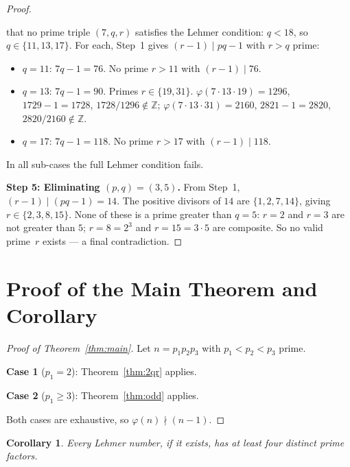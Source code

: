 \documentclass[12pt,a4paper]{amsart}
\newtheorem{corollary}[theorem]{Corollary}
\theoremstyle{definition}
\newcommand{\euler}{\varphi}
\begin{document}
\begin{proof}
\begin{itemize}
        that no prime triple $(7, q, r)$ satisfies the Lehmer condition:
        $q < 18$, so $q \in \{11, 13, 17\}$.  For each, Step~1
        gives $(r-1) \mid pq-1$ with $r > q$ prime:
        \begin{itemize}
          \item $q = 11$: $7q-1 = 76$.  No prime $r > 11$ with $(r-1) \mid 76$.
          \item $q = 13$: $7q-1 = 90$.  Primes $r \in \{19, 31\}$.
                $\varphi(7 \cdot 13 \cdot 19) = 1296$, $1729-1 = 1728$,
                $1728/1296 \notin \mathbb{Z}$;
                $\varphi(7 \cdot 13 \cdot 31) = 2160$, $2821-1 = 2820$,
                $2820/2160 \notin \mathbb{Z}$.
          \item $q = 17$: $7q-1 = 118$.  No prime $r > 17$ with $(r-1) \mid 118$.
        \end{itemize}
        In all sub-cases the full Lehmer condition fails.
\end{itemize}

\medskip
\noindent\textbf{Step 5: Eliminating $(p, q) = (3, 5)$.}
From Step~1, $(r-1) \mid (pq - 1) = 14$.  The positive divisors of $14$ are
$\{1, 2, 7, 14\}$, giving $r \in \{2, 3, 8, 15\}$.
None of these is a prime greater than $q = 5$:
$r = 2$ and $r = 3$ are not greater than $5$;
$r = 8 = 2^3$ and $r = 15 = 3 \cdot 5$ are composite.
So no valid prime~$r$ exists — a final contradiction.
\end{proof}

\section{Proof of the Main Theorem and Corollary}

\begin{proof}[Proof of Theorem~\ref{thm:main}]
Let $n = p_1 p_2 p_3$ with $p_1 < p_2 < p_3$ prime.

\textbf{Case 1} ($p_1 = 2$): Theorem~\ref{thm:2qr} applies.

\textbf{Case 2} ($p_1 \ge 3$): Theorem~\ref{thm:odd} applies.

Both cases are exhaustive, so $\euler(n) \nmid (n-1)$.
\end{proof}

\begin{corollary}
\label{cor:four}
Every Lehmer number, if it exists, has at least four distinct prime factors.
\end{corollary}
\end{document}
